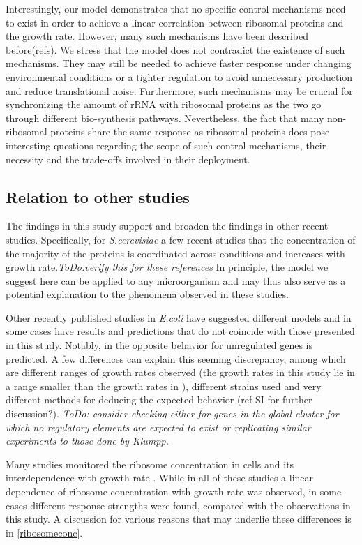 \documentclass[notitlepage]{article}
\begin{document}
Interestingly, our model demonstrates that no specific control mechanisms need to exist in order to achieve a linear correlation between ribosomal proteins and the growth rate.
However, many such mechanisms have been described before(refs).
We stress that the model does not contradict the existence of such mechanisms.
They may still be needed to achieve faster response under changing environmental conditions or a tighter regulation to avoid unnecessary production and reduce translational noise.
Furthermore, such mechanisms may be crucial for synchronizing the amount of rRNA with ribosomal proteins as the two go through different bio-synthesis pathways.
Nevertheless, the fact that many non-ribosomal proteins share the same response as ribosomal proteins does pose interesting questions regarding the scope of such control mechanisms, their necessity and the trade-offs involved in their deployment.

\subsection{Relation to other studies}
The findings in this study support and broaden the findings in other recent studies.
Specifically, for \emph{S.cerevisiae} a few recent studies that the concentration of the majority of the proteins is coordinated across conditions \parencite{Keren2013a, Gasch2000, Brauer2008a} and increases with growth rate.\emph{ToDo:verify this for these references}
In principle, the model we suggest here can be applied to any microorganism and may thus also serve as a potential explanation to the phenomena observed in these studies.

Other recently published studies in \emph{E.coli} have suggested different models and in some cases have results  and predictions that do not coincide with those presented in this study.
Notably, in \parencite{Klumpp2009a} the opposite behavior for unregulated genes is predicted.
A few differences can explain this seeming discrepancy, among which are different ranges of growth rates observed (the growth rates in this study lie in a range smaller than the growth rates in \parencite{Klumpp2009a}), different strains used and very different methods for deducing the expected behavior (ref SI for further discussion?).
\emph{ToDo: consider checking either for genes in the global cluster for which no regulatory elements are expected to exist or replicating similar experiments to those done by Klumpp.} 

Many studies monitored the ribosome concentration in cells and its interdependence with growth rate \parencite{Scott2010, Bremer1987, Schaechter1958, 1974, Zaslaver2009, eco-sal}.
While in all of these studies a linear dependence of ribosome concentration with growth rate was observed, in some cases different response strengths were found, compared with the observations in this study.
A discussion for various reasons that may underlie these differences is in \ref{ribosomeconc}.
\end{document}
